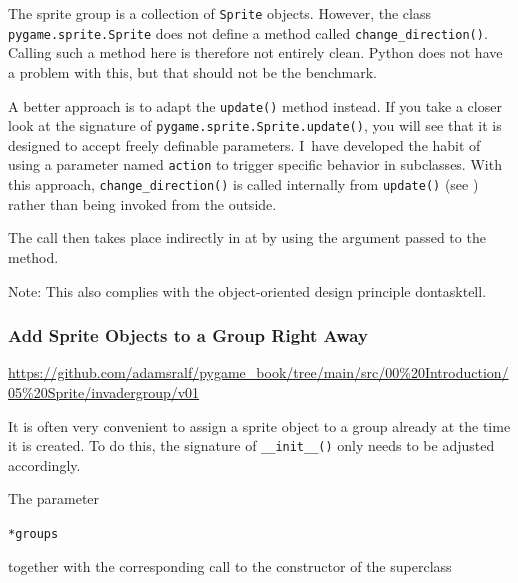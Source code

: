 The sprite group is a collection of \texttt{Sprite} objects. However, the class \texttt{pygame\-.sprite\-.Sprite} does not define a method called \texttt{change\_direction()}. Calling such a method here is therefore not entirely clean. Python does not have a problem with this, but that should not be the benchmark.

A better approach is to adapt the \texttt{update()} method instead. If you take a closer look at the \gls{signature} of \texttt{pygame.sprite.Sprite.update()}, you will see that it is designed to accept freely definable parameters. I~have developed the habit of using a parameter named \texttt{action} to trigger specific behavior in subclasses. With this approach, \texttt{change\_direction()} is called internally from \texttt{update()} (see ) rather than being invoked from the outside.


The call then takes place indirectly in  at  by using the argument passed to the method.

Note: This also complies with the object-oriented design principle \Gls{dontasktell}.


\subsubsection{Add Sprite Objects to a Group Right Away}
\begin{diskbox}
		\url{https://github.com/adamsralf/pygame_book/tree/main/src/00%20Introduction/05%20Sprite/invadergroup/v01}
\end{diskbox}

It is often very convenient to assign a sprite object to a group already at the time it is created. To do this, the signature of \texttt{\_\_init\_\_()} only needs to be adjusted accordingly.

The parameter

\verb+*groups+

together with the corresponding call to the constructor of the \gls{superclass}

